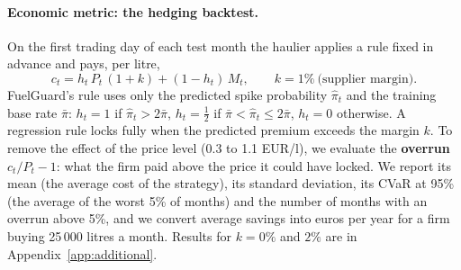\paragraph{Economic metric: the hedging backtest.} On the first trading day of each test month the haulier
applies a rule fixed in advance and pays, per litre,
\[c_t=h_t\,P_t\,(1+k)+(1-h_t)\,M_t ,\qquad k=1\%\ \text{(supplier margin)} .\]
FuelGuard's rule uses only the predicted spike probability $\hat\pi_t$ and the training base rate
$\bar\pi$: $h_t=1$ if $\hat\pi_t>2\bar\pi$, $h_t=\tfrac12$ if $\bar\pi<\hat\pi_t\le2\bar\pi$, $h_t=0$ otherwise.
A regression rule locks fully when the predicted premium exceeds the margin $k$. To remove the effect of
the price level (0.3 to 1.1 EUR/l), we evaluate the \textbf{overrun} $c_t/P_t-1$: what the firm paid above
the price it could have locked. We report its mean (the average cost of the strategy), its standard
deviation, its CVaR at 95\% (the average of the worst 5\% of months) and the number of months with an
overrun above 5\%, and we convert average savings into euros per year for a firm buying 25\,000 litres a
month. Results for $k=0\%$ and $2\%$ are in Appendix~\ref{app:additional}.
